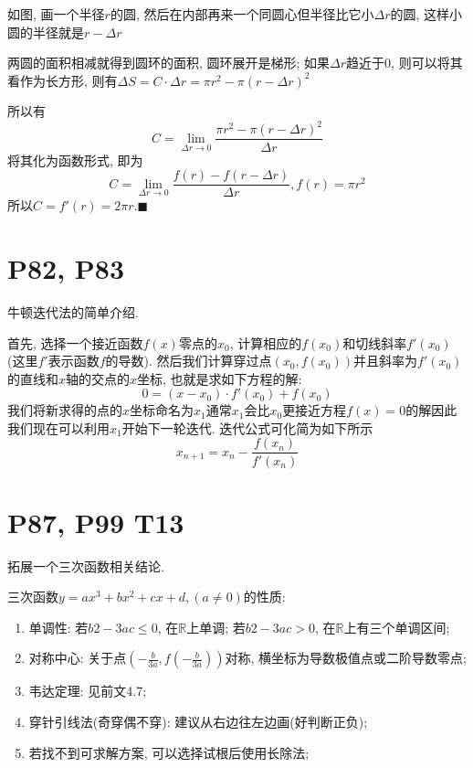 \documentclass{book}
\begin{document}
    如图, 画一个半径$r$的圆, 然后在内部再来一个同圆心但半径比它小$\Delta r$的圆, 这样小圆的半径就是$r-\Delta r$

    两圆的面积相减就得到圆环的面积, 圆环展开是梯形; 如果$\Delta r$趋近于0, 则可以将其看作为长方形, 则有$\Delta S=C\cdot \Delta r=\pi r^2-\pi \left( r-\Delta r \right)^2$

    所以有$$C=\lim_{\Delta r \to 0} \frac{\pi r^2-\pi \left ( r-\Delta r \right )^2 }{\Delta r} $$
    将其化为函数形式, 即为$$C=\lim_{\Delta r \to 0} \frac{f(r)-f(r-\Delta r) }{\Delta r} ,f(r)=\pi r^2$$
    所以$C=f'(r)=2\pi r .\blacksquare$

    \section{\textcolor[rgb]{0.11,0.65,0.52}{P82, P83}}
    \textcolor[rgb]{0.38,0.11,0.2}{牛顿迭代法}的简单介绍.\cite{Newton}

    首先, 选择一个接近函数${\displaystyle f(x)}$零点的${\displaystyle x_{0}}$, 计算相应的${\displaystyle f(x_{0})}$和切线斜率${\displaystyle f'(x_{0})}$(这里${\displaystyle f'}$表示函数${\displaystyle f}$的导数). 然后我们计算穿过点${\displaystyle (x_{0},f(x_{0}))}$并且斜率为${\displaystyle f'(x_{0})}$的直线和${\displaystyle x}$轴的交点的${\displaystyle x}$坐标, 也就是求如下方程的解:$${\displaystyle 0=(x-x_{0})\cdot f'(x_{0})+f(x_{0})}$$
    我们将新求得的点的${\displaystyle x}$坐标命名为${\displaystyle x_{1}}$通常${\displaystyle x_{1}}$会比${\displaystyle x_{0}}$更接近方程${\displaystyle f(x)=0}$的解因此我们现在可以利用${\displaystyle x_{1}}$开始下一轮迭代. 迭代公式可化简为如下所示$${\displaystyle x_{n+1}=x_{n}-{\frac {f(x_{n})}{f'(x_{n})}}}$$

    \section{\textcolor[rgb]{0.11,0.65,0.52}{P87, P99 T13}}

    拓展一个\textcolor[rgb]{0.38,0.11,0.2}{三次函数}相关结论.

    三次函数$\displaystyle y=ax^3+bx^2+cx+d,(a\neq 0)$的性质:
    \begin{enumerate}
        \item 单调性: 若$b2-3ac\le 0$, 在$\mathbb{R}$上单调; 若$b2-3ac> 0$, 在$\mathbb{R}$上有三个单调区间;
        \item 对称中心: 关于点$\displaystyle \left( -\frac{b}{3a},f\left( -\frac{b}{3a} \right) \right)$对称, \textcolor[rgb]{0.75,0.17,0.22}{横坐标为导数极值点或二阶导数零点};
        \item 韦达定理: 见前文4.7;
        \item 穿针引线法(奇穿偶不穿): 建议从右边往左边画(好判断正负);
        \item 若找不到可求解方案, 可以选择试根后使用长除法;
    \end{enumerate}
\end{document}

